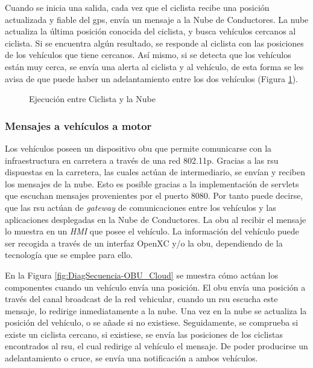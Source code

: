 Cuando se inicia una salida, cada vez que el ciclista recibe una posición
actualizada y fiable del \gls{gps}, envía un mensaje a la
Nube de Conductores. La nube actualiza la última posición conocida del
ciclista, y busca vehículos cercanos al ciclista. Si se encuentra algún
resultado, se responde al ciclista con las posiciones de los vehículos que
tiene cercanos. Así mismo, si se detecta que los vehículos están muy cerca, se
envía una alerta al ciclista y al vehículo, de esta forma se les avisa de que
puede haber un adelantamiento entre los dos vehículos (Figura
\ref{fig:DiagSecuencia-Ciclista_Cloud}).

\begin{figure}[h]
	\begin{center}
		\caption{Ejecución entre Ciclista y la Nube}
		\label{fig:DiagSecuencia-Ciclista_Cloud}
	\end{center}
\end{figure}

\subsubsection{Mensajes a vehículos a motor}\label{sssection:mensajesvehiculomotor}
Los vehículos poseen un dispositivo \gls{obu} que permite comunicarse con la
infraestructura en carretera a través de una red \gls{802.11p}. Gracias a las
\gls{rsu} dispuestas en la carretera, las cuales actúan de intermediario, se
envían y reciben los mensajes de la nube. Esto es posible gracias a la
implementación de servlets que escuchan mensajes provenientes por el puerto
$8080$. Por tanto puede decirse, que las \gls{rsu} actúan de \emph{gateway}
de comunicaciones entre los vehículos y las aplicaciones desplegadas en la
Nube de Conductores. La \gls{obu} al recibir el mensaje lo muestra en un
\emph{HMI} que posee el vehículo. La información del vehículo puede ser
recogida a través de un interfaz OpenXC y/o la \gls{obu}, dependiendo
de la tecnología que se emplee para ello.

En la Figura \ref{fig:DiagSecuencia-OBU_Cloud} se muestra cómo actúan los
componentes cuando un vehículo envía una posición. El \gls{obu} envía una
posición a través del canal broadcast de la red vehicular, cuando un \gls{rsu}
escucha este mensaje, lo redirige inmediatamente a la nube. Una vez en la nube
se actualiza la posición del vehículo, o se añade si no existiese.
Seguidamente, se comprueba si existe un ciclista cercano, si existiese, se
envía las posiciones de los ciclistas encontrados al \gls{rsu}, el cual
redirige al vehículo el mensaje. De poder producirse un adelantamiento o cruce,
se envía una notificación a ambos vehículos.

